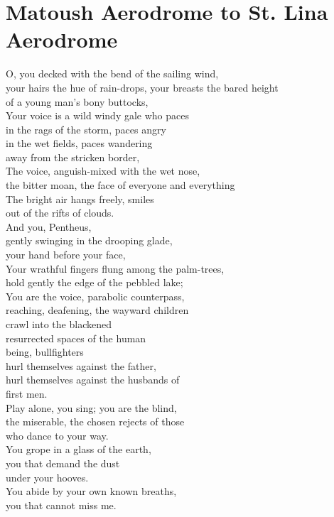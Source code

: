 \documentclass[smalldemyvopaper,11pt,twoside,onecolumn,openright,extrafontsizes]{memoir}
\newlength\drop
\begin{document}
\chapter{Matoush Aerodrome to St. Lina Aerodrome}
O, you decked with the bend of the sailing wind,
\\your hairs the hue of rain-drops, your breasts the bared height
\\of a young man's bony buttocks,
\\Your voice is a wild windy gale who paces
\\in the rags of the storm, paces angry
\\in the wet fields, paces wandering
\\away from the stricken border,
\\The voice, anguish-mixed with the wet nose,
\\the bitter moan, the face of everyone and everything
\\The bright air hangs freely, smiles
\\out of the rifts of clouds.
\\And you, Pentheus,
\\gently swinging in the drooping glade,
\\your hand before your face,
\\Your wrathful fingers flung among the palm-trees,
\\hold gently the edge of the pebbled lake;
\\You are the voice, parabolic counterpass,
\\reaching, deafening, the wayward children
\\crawl into the blackened
\\resurrected spaces of the human
\\being, bullfighters
\\hurl themselves against the father,
\\hurl themselves against the husbands of
\\first men.
\\Play alone, you sing; you are the blind,
\\the miserable, the chosen rejects of those
\\who dance to your way.
\\You grope in a glass of the earth,
\\you that demand the dust
\\under your hooves.
\\You abide by your own known breaths,
\\you that cannot miss me.
\end{document}
